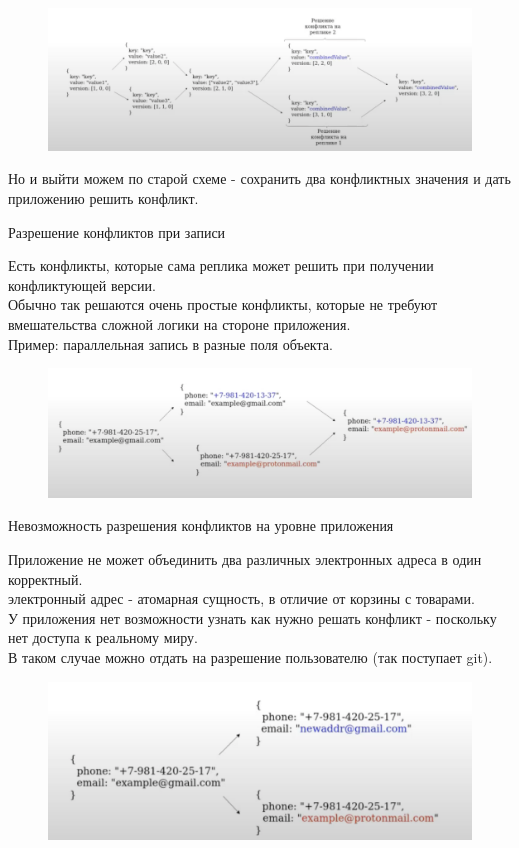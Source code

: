 \begin{figure}[h]
    \centering
    \includegraphics[scale = 0.5]{../assets/6.png}
    \caption{}
\end{figure}
Но и выйти можем по старой схеме - сохранить два конфликтных значения и дать приложению решить конфликт.
\begin{definition}
  Разрешение конфликтов при записи
\end{definition}
Есть конфликты, которые сама реплика может решить при получении конфликтующей версии.\\
Обычно так решаются очень простые конфликты, которые не требуют вмешательства сложной логики на стороне приложения.\\
Пример: параллельная запись в разные поля объекта.
\begin{figure}[h]
    \centering
    \includegraphics[scale = 0.5]{../assets/7.png}
    \caption{}
\end{figure}
\begin{definition}
  Невозможность разрешения конфликтов на уровне приложения
\end{definition}
Приложение не может объединить два различных электронных адреса в один корректный.\\
электронный адрес - атомарная сущность, в отличие от корзины с товарами.\\
У приложения нет возможности узнать как нужно решать конфликт - поскольку нет доступа к реальному миру.\\
В таком случае можно отдать на разрешение пользователю (так поступает git).
\begin{figure}[h]
    \centering
    \includegraphics[scale = 0.5]{../assets/8.png}
    \caption{}
\end{figure}

